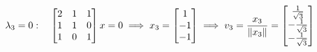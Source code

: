 \documentclass[preview]{standalone}
\begin{document}
\begin{align*}
\special{dvisvgm:raw <g id='unique000'>}\lambda_3 = 0: \special{dvisvgm:raw </g>}\special{dvisvgm:raw <g id='unique001'>}\quad \begin{bmatrix} 2 & 1 & 1 \\ 1 & 1 & 0 \\ 1 & 0 & 1 \end{bmatrix} x = 0 \special{dvisvgm:raw </g>}\special{dvisvgm:raw <g id='unique002'>}\implies x_3 = \begin{bmatrix} 1 \\ -1 \\ -1 \end{bmatrix} \special{dvisvgm:raw </g>}\special{dvisvgm:raw <g id='unique003'>}\implies v_3 = \frac{x_3}{\|x_3\|} = \begin{bmatrix} \frac{1}{\sqrt{3}} \\ -\frac{1}{\sqrt{3}} \\ -\frac{1}{\sqrt{3}} \end{bmatrix}\special{dvisvgm:raw </g>}
\end{align*}
\end{document}
